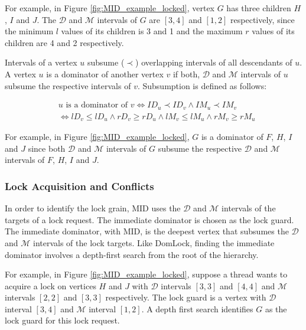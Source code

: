 For example, in Figure \ref{fig:MID_example_locked}, vertex $G$ has three children $H$, $I$ and $J$. The $\mathcal{D}$ and $\mathcal{M}$ intervals of $G$ are $[3,4]$ and $[1,2]$ respectively, since the minimum $l$ values of its children is 3 and 1 and the maximum $r$ values of its children are 4 and 2 respectively.

Intervals of a vertex $u$ subsume ($\prec$) overlapping intervals of all descendants of $u$. A vertex $u$ is a dominator of another vertex $v$ if both, $\mathcal{D}$ and $\mathcal{M}$ intervals of $u$ subsume the respective intervals of $v$.
Subsumption is defined as follows:

\begin{equation}
    \begin{split}
        & u \text{ is a dominator of } v \iff ID_u \prec ID_v \land IM_u \prec IM_v
        \\ & \iff \mathit{lD}_v \leq \mathit{lD}_u \land \mathit{rD}_v \geq \mathit{rD}_u \land \mathit{lM}_v \leq \mathit{lM}_u \land \mathit{rM}_v \geq \mathit{rM}_u
    \end{split}
\end{equation}

For example, in Figure \ref{fig:MID_example_locked}, $G$ is a dominator of $F$, $H$, $I$ and $J$ since both $\mathcal{D}$ and $\mathcal{M}$ intervals of $G$ subsume the respective $\mathcal{D}$ and $\mathcal{M}$ intervals of $F$, $H$, $I$ and $J$.

\subsubsection{Lock Acquisition and Conflicts}
In order to identify the lock grain, MID uses the $\mathcal{D}$ and $\mathcal{M}$ intervals of the targets of a lock request. The immediate dominator is chosen as the lock guard. The immediate dominator, with MID, is the deepest vertex that subsumes the $\mathcal{D}$ and $\mathcal{M}$ intervals of the lock targets. Like DomLock, finding the immediate dominator involves a depth-first search from the root of the hierarchy.

For example, in Figure \ref{fig:MID_example_locked}, suppose a thread wants to acquire a lock on vertices $H$ and $J$ with $\mathcal{D}$ intervals $[3,3]$ and $[4,4]$ and $\mathcal{M}$ intervals $[2,2]$ and $[3,3]$ respectively. The lock guard is a vertex with $\mathcal{D}$ interval $[3,4]$ and $\mathcal{M}$ interval $[1,2]$. A depth first search identifies $G$ as the lock guard for this lock request. 


